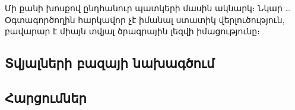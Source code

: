 {
	Մի քանի խոսքով ընդհանուր պատկերի մասին ակնարկ։ Նկար \ldots
	Օգտագործողին հարկավոր չէ իմանալ ստատիկ վերլուծություն, բավարար է միայն տվյալ ծրագրային լեզվի իմացությունը։

	\subsection{Տվյալների բազայի նախագծում}\label{subsec:dataBaseDesign}
	

	\subsection{Հարցումներ}\label{subsec:queries}
	
}
